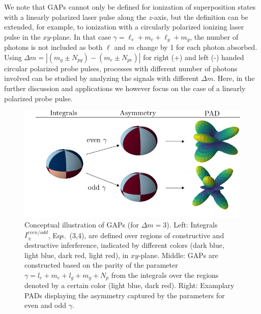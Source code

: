 We note that GAPs cannot only be defined for ionization of superposition states with a linearly polarized laser pulse along the $z$-axis, but the definition can be extended, for example, to ionization with a circularly polarized ionizing laser pulse in the $xy$-plane. In that case $\gamma=\ell_e + m_e + \ell_g + m_g$, the number of photons is not included as both $\ell$ and $m$ change by 1 for each photon absorbed. Using $\Delta m = |(m_g \pm N_{pg}) - (m_e \pm N_{pe})|$  for right (+) and left (-) handed circular polarized probe pulses, processes with different number of photons involved can be studied by analyzing the signals with different $\Delta m$. Here, in the further discussion and applications we however focus on the case of a linearly polarized probe pulse.

\begin{figure}[!ht]
\centering
\includegraphics[width=\linewidth]{figs/Photo_ionization/GAP/integral_combined.pdf}
\caption{
Conceptual illustration of GAPs (for $\Delta m=3$). Left: Integrals $I_\pm^{even/odd}$, Eqs.~(3,4), are defined over regions of constructive and destructive inferference, indicated by different colors (dark blue, light blue, dark red, light red), in $xy$-plane.
Middle: GAPs are constructed based on the parity of the parameter $\gamma = l_e+m_e+l_g+m_g+N_p$ from the integrals over the regions denoted by a certain color (light blue, dark red). 
Right: Examplary PADs displaying the asymmetry captured by the parameters for even and odd $\gamma$.
} 
  \label{fig:integrals}
\end{figure}


